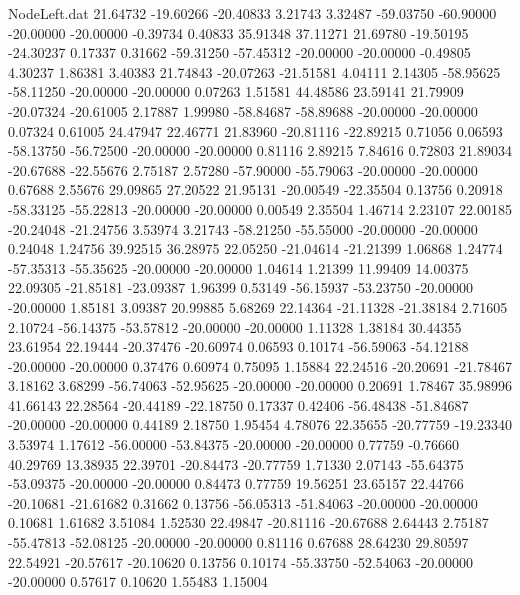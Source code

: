 \begin{filecontents}{NodeLeft.dat}
  21.64732  -19.60266  -20.40833     3.21743    3.32487  -59.03750  -60.90000  -20.00000  -20.00000   -0.39734    0.40833   35.91348   37.11271
  21.69780  -19.50195  -24.30237     0.17337    0.31662  -59.31250  -57.45312  -20.00000  -20.00000   -0.49805    4.30237    1.86381    3.40383
  21.74843  -20.07263  -21.51581     4.04111    2.14305  -58.95625  -58.11250  -20.00000  -20.00000    0.07263    1.51581   44.48586   23.59141
  21.79909  -20.07324  -20.61005     2.17887    1.99980  -58.84687  -58.89688  -20.00000  -20.00000    0.07324    0.61005   24.47947   22.46771
  21.83960  -20.81116  -22.89215     0.71056    0.06593  -58.13750  -56.72500  -20.00000  -20.00000    0.81116    2.89215    7.84616    0.72803
  21.89034  -20.67688  -22.55676     2.75187    2.57280  -57.90000  -55.79063  -20.00000  -20.00000    0.67688    2.55676   29.09865   27.20522
  21.95131  -20.00549  -22.35504     0.13756    0.20918  -58.33125  -55.22813  -20.00000  -20.00000    0.00549    2.35504    1.46714    2.23107
  22.00185  -20.24048  -21.24756     3.53974    3.21743  -58.21250  -55.55000  -20.00000  -20.00000    0.24048    1.24756   39.92515   36.28975
  22.05250  -21.04614  -21.21399     1.06868    1.24774  -57.35313  -55.35625  -20.00000  -20.00000    1.04614    1.21399   11.99409   14.00375
  22.09305  -21.85181  -23.09387     1.96399    0.53149  -56.15937  -53.23750  -20.00000  -20.00000    1.85181    3.09387   20.99885    5.68269
  22.14364  -21.11328  -21.38184     2.71605    2.10724  -56.14375  -53.57812  -20.00000  -20.00000    1.11328    1.38184   30.44355   23.61954
  22.19444  -20.37476  -20.60974     0.06593    0.10174  -56.59063  -54.12188  -20.00000  -20.00000    0.37476    0.60974    0.75095    1.15884
  22.24516  -20.20691  -21.78467     3.18162    3.68299  -56.74063  -52.95625  -20.00000  -20.00000    0.20691    1.78467   35.98996   41.66143
  22.28564  -20.44189  -22.18750     0.17337    0.42406  -56.48438  -51.84687  -20.00000  -20.00000    0.44189    2.18750    1.95454    4.78076
  22.35655  -20.77759  -19.23340     3.53974    1.17612  -56.00000  -53.84375  -20.00000  -20.00000    0.77759   -0.76660   40.29769   13.38935
  22.39701  -20.84473  -20.77759     1.71330    2.07143  -55.64375  -53.09375  -20.00000  -20.00000    0.84473    0.77759   19.56251   23.65157
  22.44766  -20.10681  -21.61682     0.31662    0.13756  -56.05313  -51.84063  -20.00000  -20.00000    0.10681    1.61682    3.51084    1.52530
  22.49847  -20.81116  -20.67688     2.64443    2.75187  -55.47813  -52.08125  -20.00000  -20.00000    0.81116    0.67688   28.64230   29.80597
  22.54921  -20.57617  -20.10620     0.13756    0.10174  -55.33750  -52.54063  -20.00000  -20.00000    0.57617    0.10620    1.55483    1.15004

\end{filecontents}
